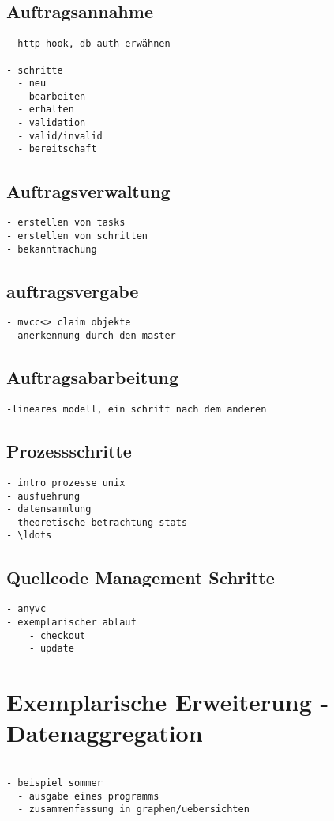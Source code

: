 \subsection{Auftragsannahme}

\begin{verbatim}
- http hook, db auth erwähnen

- schritte
  - neu
  - bearbeiten
  - erhalten
  - validation
  - valid/invalid
  - bereitschaft
\end{verbatim}

\subsection{Auftragsverwaltung}

\begin{verbatim}
- erstellen von tasks
- erstellen von schritten
- bekanntmachung
\end{verbatim}

\subsection{auftragsvergabe}

\begin{verbatim}
- mvcc<> claim objekte
- anerkennung durch den master

\end{verbatim}

\subsection{Auftragsabarbeitung}
\begin{verbatim}
-lineares modell, ein schritt nach dem anderen
\end{verbatim}

\subsection{Prozessschritte}

\begin{verbatim}
- intro prozesse unix
- ausfuehrung
- datensammlung
- theoretische betrachtung stats
- \ldots
\end{verbatim}

\subsection{Quellcode Management Schritte}


\begin{verbatim}
- anyvc
- exemplarischer ablauf
    - checkout
    - update
\end{verbatim}

\section{Exemplarische Erweiterung - Datenaggregation}

 
\begin{verbatim}

- beispiel sommer
  - ausgabe eines programms
  - zusammenfassung in graphen/uebersichten

\end{verbatim}

